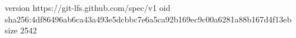 version https://git-lfs.github.com/spec/v1
oid sha256:4df86496ab6ca43a493e5dcbbc7e6a5ca92b169ec9c00a6281a88b167d4f13eb
size 2542

